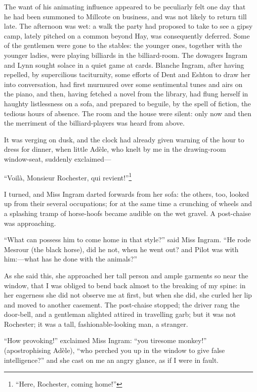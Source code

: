 The want of his animating influence appeared to be peculiarly felt one
day that he had been summoned to Millcote on business, and was not
likely to return till late. The afternoon was wet: a walk the party had
proposed to take to see a gipsy camp, lately pitched on a common beyond
Hay, was consequently deferred. Some of the gentlemen were gone to the
stables: the younger ones, together with the younger ladies, were
playing billiards in the billiard-room. The dowagers Ingram and Lynn
sought solace in a quiet game at cards. Blanche Ingram, after having
repelled, by supercilious taciturnity, some efforts of \Mrs{} Dent and
\Mrs{} Eshton to draw her into conversation, had first murmured over some
sentimental tunes and airs on the piano, and then, having fetched a
novel from the library, had flung herself in haughty listlessness on a
sofa, and prepared to beguile, by the spell of fiction, the tedious
hours of absence. The room and the house were silent: only now and then
the merriment of the billiard-players was heard from above.

It was verging on dusk, and the clock had already given warning of the
hour to dress for dinner, when little Adèle, who knelt by me in the
drawing-room window-seat, suddenly exclaimed---

\foreignquote{french}{Voilà, Monsieur Rochester, qui revient!}\footnote{
\enquote{Here, \Mr{} Rochester, coming home!}}

I turned, and Miss Ingram darted forwards from her sofa: the others,
too, looked up from their several occupations; for at the same time a
crunching of wheels and a splashing tramp of horse-hoofs became audible
on the wet gravel. A post-chaise was approaching.

\enquote{What can possess him to come home in that style?} said Miss
Ingram. \enquote{He rode Mesrour (the black horse), did he not, when he
went out? and Pilot was with him:---what has he done with the animals?}

As she said this, she approached her tall person and ample garments so
near the window, that I was obliged to bend back almost to the breaking
of my spine: in her eagerness she did not observe me at first, but when
she did, she curled her lip and moved to another casement. The
post-chaise stopped; the driver rang the door-bell, and a gentleman
alighted attired in travelling garb; but it was not \Mr{} Rochester; it
was a tall, fashionable-looking man, a stranger.

\enquote{How provoking!} exclaimed Miss Ingram: \enquote{you tiresome
monkey!} (apostrophising Adèle), \enquote{who perched you up in the
window to give false intelligence?} and she cast on me an angry glance,
as if I were in fault.

